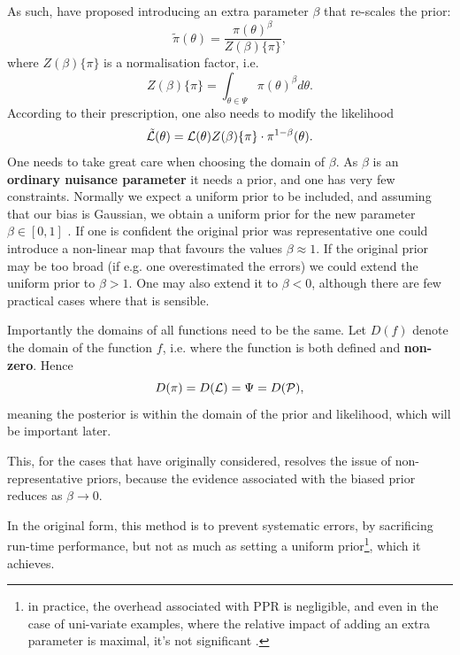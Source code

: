 \documentclass[usenatbib]{mnras}
\begin{document}
As such, \citeauthor{chen-ferroz-hobson} have proposed introducing an
extra parameter \(\beta\) that re-scales the prior:
\begin{equation}
  \tilde{\pi}(\theta) = \frac{\pi(\theta)^{\beta}}{Z(\beta)\{\pi\}},
\end{equation}
where \(Z(\beta)\{\pi\}\) is a normalisation factor, i.e. 
\begin{equation}
  Z(\beta)\{\pi\} = \int_{\theta \in \Psi} \pi(\theta)^{\beta}d\theta.
\end{equation}
According to their prescription, one also needs to modify the likelihood
\begin{equation}
  \tilde{\cal L}(\theta) = {\cal L}(\theta) Z(\beta)\{\pi\} \cdot \pi^{1-\beta}(\theta).
\end{equation}
One needs to take great care when choosing the domain of
\(\beta\). As \(\beta\) is an \textbf{ordinary nuisance parameter} it needs
a prior, and one has very few constraints. Normally we expect a
uniform prior to be included, and assuming that our bias is
Gaussian, we obtain a uniform prior for the new parameter \(\beta
   \in [0, 1]\) . If one is confident the original prior was
representative one could introduce a non-linear map that favours
the values \(\beta\approx1\). If the original prior may be too broad
(if e.g. one overestimated the errors) we could extend the uniform
prior to \(\beta>1\). One may also extend it to \(\beta<0\), although
there are few practical cases where that is sensible.




Importantly the domains of all functions need to be the same. Let
\(D(f)\) denote the domain of the function \(f\), i.e. where the
function is both defined and \textbf{non-zero}. Hence
\begin{equation}
  D(\pi) = D({\cal L}) = \Psi = D({\cal P}),
\end{equation} 
meaning the posterior is within the domain of the prior and
likelihood, which will be important later.\label{domain-discussion}

This, for the cases that \citeauthor{chen-ferroz-hobson} have
originally considered, resolves the issue of non-representative
priors, because the evidence associated with the biased prior
reduces as \(\beta\rightarrow0\).

In the original form, this method is to prevent systematic errors,
by sacrificing run-time performance, but not as much as setting a
uniform prior\footnote{in practice, the overhead associated with PPR
is negligible, and even in the case of uni-variate examples, where
the relative impact of adding an extra parameter is maximal, it's
not significant \cite[see numerical
examples]{chen-ferroz-hobson}.}, which it achieves. 
\end{document}
